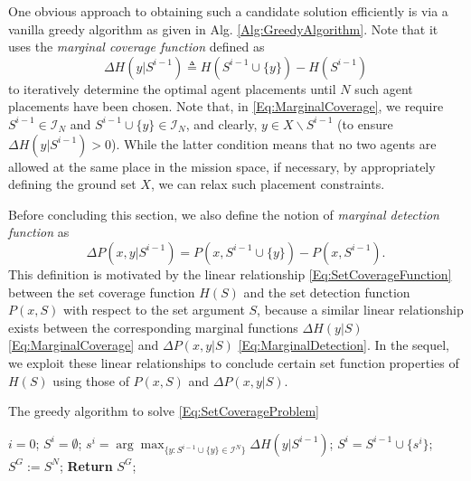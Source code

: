 \documentclass[letterpaper, 10 pt, conference]{ieeeconf}
\begin{document}
One obvious approach to obtaining such a candidate solution efficiently is via a vanilla greedy algorithm as given in Alg. \ref{Alg:GreedyAlgorithm}. Note that it uses the \emph{marginal coverage function} defined as
\begin{equation}\label{Eq:MarginalCoverage}
    \Delta H(y \vert S^{i-1}) \triangleq H(S^{i-1}\cup\{y\}) - H(S^{i-1})
\end{equation}
to iteratively determine the optimal agent placements until $N$ such agent placements have been chosen. Note that, in \eqref{Eq:MarginalCoverage}, we require $S^{i-1}\in\mathcal{I}_N$ and $S^{i-1}\cup\{y\} \in\mathcal{I}_N$, and clearly, $y \in X \backslash S^{i-1}$ (to ensure $\Delta H(y \vert S^{i-1})>0$). While the latter condition means that no two agents are allowed at the same place in the mission space, if necessary, by appropriately defining the ground set $X$, we can relax such placement constraints. 

Before concluding this section, we also define the notion of \emph{marginal detection function} as
\begin{equation}\label{Eq:MarginalDetection}
    \Delta P(x, y \vert S^{i-1}) = P(x, S^{i-1}\cup\{y\}) - P(x, S^{i-1}).
\end{equation}
This definition is motivated by the linear relationship \eqref{Eq:SetCoverageFunction} between the set coverage function $H(S)$ and the set detection function $P(x,S)$ with respect to the set argument $S$, because a similar linear relationship exists between the corresponding marginal functions $\Delta H(y \vert S)$ \eqref{Eq:MarginalCoverage} and $\Delta P(x,y\vert S)$ \eqref{Eq:MarginalDetection}. In the sequel, we exploit these linear relationships to conclude certain set function properties of $H(S)$ using those of $P(x,S)$ and $\Delta P(x,y\vert S)$.

\begin{algorithm}[!h]
\caption{The greedy algorithm to solve \eqref{Eq:SetCoverageProblem}}\label{Alg:GreedyAlgorithm}
\begin{algorithmic}[1]
\State $i=0$; $S^i = \emptyset$;  
    \State $s^{i} = \arg \max_{\{y:S^{i-1} \cup \{y\} \in \mathcal{I}^N\}} \Delta H(y \vert S^{i-1})$; 
    \State $S^{i} = S^{i-1} \cup \{s^{i}\}$; 
\EndFor
\State $S^G := S^N$;  \textbf{Return} $S^G$;
\end{algorithmic}
\end{algorithm}
\end{document}
